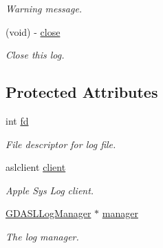 \begin{DoxyCompactItemize}
\begin{DoxyCompactList}\small\item\em Warning message. \item\end{DoxyCompactList}\item 
(void) -\/ \hyperlink{interface_g_d_a_s_l_log_ae49db911364a0162197ad1044126c664}{close}
\begin{DoxyCompactList}\small\item\em Close this log. \item\end{DoxyCompactList}\end{DoxyCompactItemize}
\subsection*{Protected Attributes}
\begin{DoxyCompactItemize}
\item 
\hypertarget{interface_g_d_a_s_l_log_aa69c49b2936c65539d487acfbac9185d}{
int \hyperlink{interface_g_d_a_s_l_log_aa69c49b2936c65539d487acfbac9185d}{fd}}
\label{interface_g_d_a_s_l_log_aa69c49b2936c65539d487acfbac9185d}

\begin{DoxyCompactList}\small\item\em File descriptor for log file. \item\end{DoxyCompactList}\item 
\hypertarget{interface_g_d_a_s_l_log_ab29df9174c1a01a320b089b589fa731e}{
aslclient \hyperlink{interface_g_d_a_s_l_log_ab29df9174c1a01a320b089b589fa731e}{client}}
\label{interface_g_d_a_s_l_log_ab29df9174c1a01a320b089b589fa731e}

\begin{DoxyCompactList}\small\item\em Apple Sys Log client. \item\end{DoxyCompactList}\item 
\hypertarget{interface_g_d_a_s_l_log_a59dd6d166636c172e8c6a2b06d550e42}{
\hyperlink{interface_g_d_a_s_l_log_manager}{GDASLLogManager} $\ast$ \hyperlink{interface_g_d_a_s_l_log_a59dd6d166636c172e8c6a2b06d550e42}{manager}}
\label{interface_g_d_a_s_l_log_a59dd6d166636c172e8c6a2b06d550e42}

\begin{DoxyCompactList}\small\item\em The log manager. \item\end{DoxyCompactList}\end{DoxyCompactItemize}
